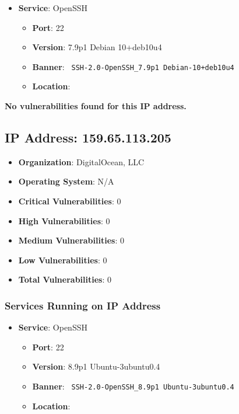 \documentclass{article}
\begin{document}
\begin{itemize}
    
        \item \textbf{Service}: OpenSSH
        \begin{itemize}
            \item \textbf{Port}: 22
            \item \textbf{Version}:  7.9p1 Debian 10+deb10u4 
            \item \textbf{Banner}: \texttt{
                SSH-2.0-OpenSSH\_7.9p1 Debian-10+deb10u4
            }
            \item \textbf{Location}: \href{  }{  }
        \end{itemize}
    
\end{itemize}


\textbf{No vulnerabilities found for this IP address.}




\clearpage



\subsection*{IP Address: 159.65.113.205}

\begin{itemize}
    \item \textbf{Organization}: DigitalOcean, LLC
    \item \textbf{Operating System}:  N/A 
    \item \textbf{Critical Vulnerabilities}: 0
    \item \textbf{High Vulnerabilities}: 0
    \item \textbf{Medium Vulnerabilities}: 0
    \item \textbf{Low Vulnerabilities}: 0
    \item \textbf{Total Vulnerabilities}: 0
\end{itemize}

\subsubsection*{Services Running on IP Address}

\begin{itemize}
    
        \item \textbf{Service}: OpenSSH
        \begin{itemize}
            \item \textbf{Port}: 22
            \item \textbf{Version}:  8.9p1 Ubuntu-3ubuntu0.4 
            \item \textbf{Banner}: \texttt{
                SSH-2.0-OpenSSH\_8.9p1 Ubuntu-3ubuntu0.4
            }
            \item \textbf{Location}: \href{  }{  }
        \end{itemize}
    
\end{itemize}
\end{document}

